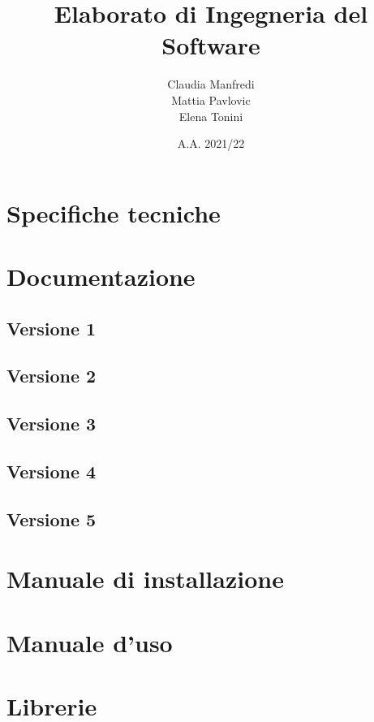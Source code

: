 \documentclass{report}
\title{Elaborato di Ingegneria del Software}
\author{Claudia Manfredi\\Mattia Pavlovic\\Elena Tonini}
\date{A.A. 2021/22}
\begin{document}
\maketitle
\tableofcontents

\chapter{Specifiche tecniche}


\chapter{Documentazione}

\section{Versione 1}





\cleardoublepage
\section{Versione 2}






\cleardoublepage
\section{Versione 3}






\cleardoublepage
\section{Versione 4}






\cleardoublepage
\section{Versione 5}






\chapter{Manuale di installazione}


\chapter{Manuale d'uso}



\chapter{Librerie}

\end{document}
